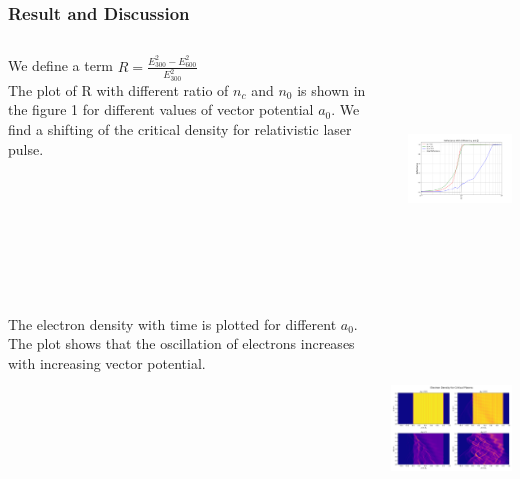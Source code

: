 \documentclass{beamer}
\begin{document}
\begin{frame}
\frametitle{Result and Discussion}
\small
\begin{columns}
    \begin{column}{0.3\textwidth}
        We define a term 
        $
            R= \frac{{E_{300}^2}-{E_{600}^2}}{{E_{300}^2}}
        $\\
        The plot of R with different ratio of $n_c$ and $n_0$ is shown in the figure 1 for different values of vector potential $a_0$. We find a shifting of the critical density for relativistic laser pulse.
    \end{column}
    \begin{column}{0.7\textwidth}  %
        \includegraphics[width=8cm, height=6cm]{reflection.png}
    \end{column}
    \end{columns}
\end{frame}
\begin{frame}
    \small
    \begin{columns}
        \begin{column}{0.3\textwidth}
            The electron density with time is plotted for different $a_0$. The plot shows that the oscillation of electrons increases with increasing vector potential.
        \end{column}
        \begin{column}{0.7\textwidth}  %
            \includegraphics[width=8cm, height=6cm]{density.png}
        \end{column}
        \end{columns}
\end{frame}
\end{document}
